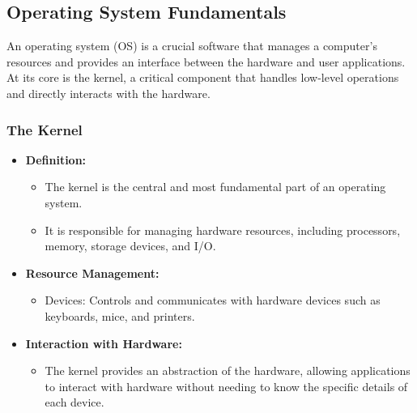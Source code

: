 \subsection{Operating System Fundamentals}
An operating system (OS) is a crucial software that manages a computer's resources and provides an interface between the hardware and user applications. At its core is the kernel, a critical component that handles low-level operations and directly interacts with the hardware.

\subsubsection{The Kernel}
\begin{itemize}
    \item \textbf{Definition:}
    \begin{itemize}
        \item The kernel is the central and most fundamental part of an operating system.
        \item It is responsible for managing hardware resources, including processors, memory, storage devices, and I/O.
    \end{itemize}
    \item \textbf{Resource Management:}
    \begin{itemize}
        \item Devices: Controls and communicates with hardware devices such as keyboards, mice, and printers.
    \end{itemize}
    \item \textbf{Interaction with Hardware:}
    \begin{itemize}
        \item The kernel provides an abstraction of the hardware, allowing applications to interact with hardware without needing to know the specific details of each device.
    \end{itemize}
\end{itemize}

